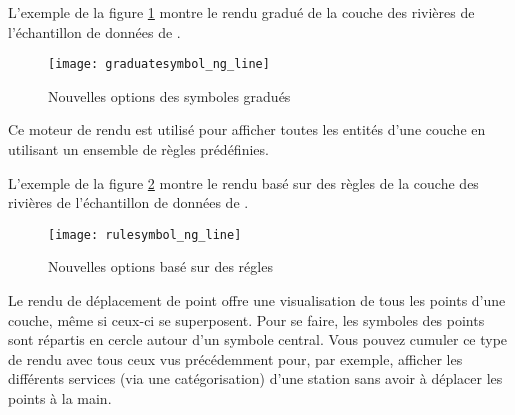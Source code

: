L'exemple de la figure \ref{fig:gradsymNG} montre le rendu gradué de la couche des rivières de l'échantillon de données de \qg.

\begin{figure}[ht]
   \centering
   \texttt{[image: graduatesymbol\_ng\_line]}
   \caption{Nouvelles options des symboles gradués \nixcaption}\label{fig:gradsymNG}
\end{figure}


Ce moteur de rendu est utilisé pour afficher toutes les entités d'une couche en utilisant un ensemble de règles prédéfinies.

L'exemple de la figure \ref{fig:rulesymNG} montre le rendu basé sur des règles de la couche des rivières de l'échantillon de données de \qg.

\begin{figure}[ht]
   \centering
   \texttt{[image: rulesymbol\_ng\_line]}
   \caption{Nouvelles options basé sur des régles \nixcaption}\label{fig:rulesymNG}
\end{figure}


Le rendu de déplacement de point offre une visualisation de tous les points d'une couche, même si ceux-ci se superposent. Pour se faire, les symboles des points sont répartis en cercle autour d'un symbole central. Vous pouvez cumuler ce type de rendu avec tous ceux vus précédemment pour, par exemple, afficher les différents services (via une catégorisation) d'une station sans avoir à déplacer les points à la main.

